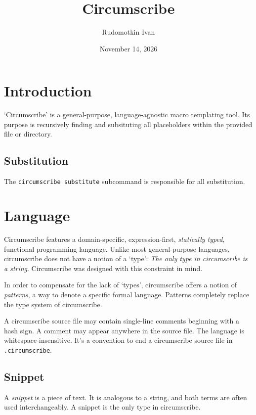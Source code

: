 \documentclass{article}
\title{Circumscribe}
\author{Rudomotkin Ivan}
\date{November 14, 2026}
\begin{document}
\maketitle

\tableofcontents

\section{Introduction}

`Circumscribe' is a general-purpose, language-agnostic macro templating tool.
Its purpose is recursively finding and subsituting all placeholders within the
provided file or directory.

\subsection{Substitution}

The \texttt{circumscribe substitute} subcommand is responsible for all substitution.

\section{Language}

Circumscribe features a domain-specific, expression-first, \emph{statically typed}, functional programming language.
Unlike most general-purpose languages, circumscribe does not have a notion of a
`type': \emph{The only type in circumscribe is a string}. Circumscribe was designed
with this constraint in mind.

In order to compensate for the lack of `types', circumscribe offers a notion of \emph{patterns},
a way to denote a specific formal language. Patterns completely replace the type system of circumscribe.

A circumscribe source file may contain single-line comments beginning with a hash sign. A comment may appear anywhere in
the source file. The language is whitespace-insensitive. It's a convention to end a circumscribe source file in \texttt{.circumscribe}.

\subsection{Snippet}

A \emph{snippet} is a piece of text. It is analogous to a string, and both terms are often used interchangeably.
A snippet is the only type in circumscribe.
\end{document}
